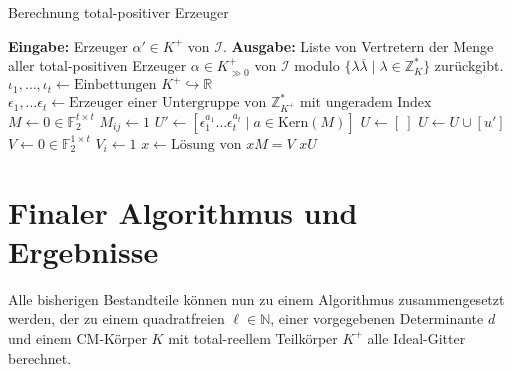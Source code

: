 \documentclass[12pt,a4paper,halfparskip,headsepline,bibtotocnumbered]{scrreprt}
\theoremstyle{nummermitklammern}
\theoremstyle{nonumberbreak}
\newcommand{\N}{\mathbb{N}}
\newcommand{\Z}{\mathbb{Z}}
\newcommand{\R}{\mathbb{R}}
\newcommand{\F}{\mathbb{F}}
\newcommand{\I}{\mathcal{I}}
\begin{document}
\begin{algorithm}[H]
	\caption{Berechnung total-positiver Erzeuger}\label{alg:posgen}
	\begin{algorithmic}[1]
		\State \textbf{Eingabe:} Erzeuger $\alpha' \in K^+$ von $\I$.
		\State \textbf{Ausgabe:} Liste von Vertretern der Menge aller total-positiven Erzeuger $\alpha \in K_{\gg 0}^+$ von $\I$ modulo $\lbrace \lambda \overline{\lambda} \mid \lambda \in \Z_K^\ast \rbrace$ zurückgibt.
		\\
		\State $\iota_1, \dots, \iota_t \gets \text{Einbettungen } K^+ \hookrightarrow \R$
		\State $\epsilon_1, \dots \epsilon_t \gets \text{Erzeuger einer Untergruppe von } \Z_{K^+}^\ast \text{ mit ungeradem Index}$
		\State $M \gets 0 \in \F_2^{t \times t}$
				\State $M_{ij} \gets 1$
			\EndIf
		\EndFor
		\State $U' \gets \left[ \epsilon_1^{a_1} \dots \epsilon_t^{a_t} \mid a \in \text{Kern}(M) \right]$
		\State $U \gets \left[ \ \right]$
			\If {$u' \neq u \lambda \overline{\lambda} \text{ für alle } u \in U, \lambda \in \Z_K^\ast$}
				\State $U \gets U \cup \left[ u' \right]$
			\EndIf
		\EndFor
		\State $V \gets 0 \in \F_2^{1 \times t}$
				\State $V_i \gets 1$
			\EndIf
		\EndFor
		\State $x \gets \text{Lösung von } xM = V$
		\State \Return $xU$
	\end{algorithmic}
\end{algorithm}

\section{Finaler Algorithmus und Ergebnisse}

Alle bisherigen Bestandteile können nun zu einem Algorithmus zusammengesetzt werden, der zu einem quadratfreien $\ell \in \N$, einer vorgegebenen Determinante $d$ und einem CM-Körper $K$ mit total-reellem Teilkörper $K^+$ alle Ideal-Gitter berechnet.
\end{document}
